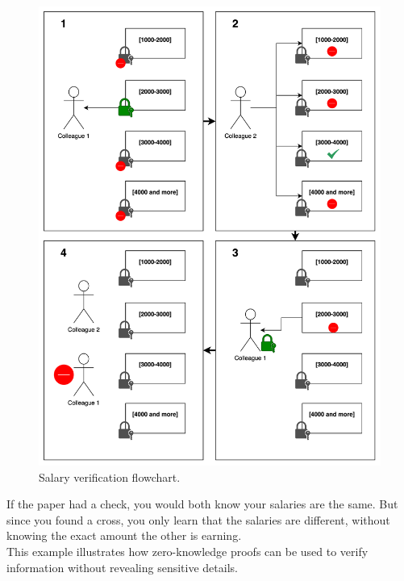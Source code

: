 \begin{figure}[ht!]
\centering
\includegraphics[scale=0.09]{Simple Examples/salary.png}
\caption{Salary verification flowchart.}
\end{figure}

If the paper had a check, you would both know your salaries are the same. But since you found a cross, you only learn that the salaries are different, without knowing the exact amount the other is earning.
\\
This example illustrates how zero-knowledge proofs can be used to verify information without revealing sensitive details.
